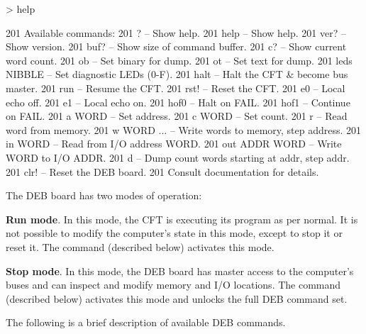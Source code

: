 \begin{debcode}
[running]> help

201 Available commands:
201  ? -- Show help.
201  help -- Show help.
201  ver? -- Show version.
201  buf? -- Show size of command buffer.
201  c? -- Show current word count.
201  ob -- Set binary for dump.
201  ot -- Set text for dump.
201  leds NIBBLE -- Set diagnostic LEDs (0-F).
201  halt -- Halt the CFT & become bus master.
201  run -- Resume the CFT.
201  rst! -- Reset the CFT.
201  e0 -- Local echo off.
201  e1 -- Local echo on.
201  hof0 -- Halt on FAIL.
201  hof1 -- Continue on FAIL.
201  a WORD -- Set address.
201  c WORD -- Set count.
201  r -- Read word from memory.
201  w WORD ... -- Write words to memory, step address.
201  in WORD -- Read from I/O address WORD.
201  out ADDR WORD -- Write WORD to I/O ADDR.
201  d -- Dump count words starting at addr, step addr.
201  clr! -- Reset the DEB board.
201 Consult documentation for details.
\end{debcode}

The \gls{DEB} board has two modes of operation:

\begin{description}

\item{\bfseries Run mode}. In this mode, the CFT is executing its program as
  per normal. It is not possible to modify the computer's state in
  this mode, except to stop it or reset it. The  command
  (described below) activates this mode.

\item{\bfseries Stop mode}. In this mode, the \gls{DEB} board has master
  access to the computer's buses and can inspect and modify memory and
  I/O locations. The  command (described below) activates
  this mode and unlocks the full \gls{DEB} command set.

\end{description}

The following is a brief description of available \gls{DEB} commands.

